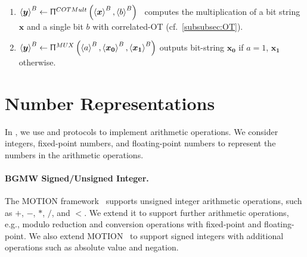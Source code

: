 \begin{enumerate}
      \item $\left\langle \boldsymbol{y}\right\rangle^B \gets \Uppi^{COTMult}\left(\left\langle \boldsymbol{x}\right\rangle ^B,\left\langle b\right\rangle ^B\right) $~\cite{asharov2018privacy,schneider2019episode} computes the multiplication of a bit string $ \boldsymbol{x}$ and a single bit $ b$ with correlated-OT (cf.~\autoref{subsubsec:OT}).

      \item $\left\langle \boldsymbol{y}\right\rangle ^B \gets  \Uppi^{MUX}\left(\left\langle a\right\rangle^B, \left\langle \boldsymbol{x_0}\right\rangle^B ,\left\langle \boldsymbol{x_1}\right\rangle^B  \right) $ outputs bit-string $ \boldsymbol{x_0} $ if $a=1$, $\boldsymbol{x_1} $ otherwise.

\end{enumerate}

\section{Number Representations}
\label{sec:NumberRepresentationsandArithmeticOperations}
In \smpc, we use \booleanGMW and \arithmeticGMW protocols to implement arithmetic operations. We consider integers, fixed-point numbers, and floating-point numbers to represent the numbers in the arithmetic operations.


\paragraph{BGMW Signed/Unsigned Integer.}
The MOTION framework~\cite{braun2022motion} supports \booleanGMW unsigned integer arithmetic operations, such as $+$, $-$, $*$, $/$, and $<$. We extend it to support further arithmetic operations, e.g., modulo reduction and conversion operations with \booleanGMW fixed-point and \booleanGMW floating-point.
We also extend MOTION~\cite{braun2022motion} to support \booleanGMW signed integers with additional operations such as absolute value and negation.

